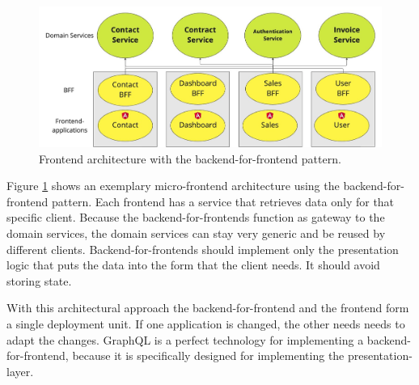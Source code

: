 \ifshowImages
\begin{figure}[H]
    \centering
    \includegraphics[width=0.8\linewidth]{images/ui-bff-architecture.jpeg}
    \caption{Frontend architecture with the backend-for-frontend pattern.}\label{figure:state-of-the-art:ui-bff-architecture}
\end{figure}
\fi

\noindent Figure \ref{figure:state-of-the-art:ui-bff-architecture} shows an exemplary micro-frontend architecture using the backend-for-frontend pattern. Each frontend has a service that retrieves data only for that specific client. Because the backend-for-frontends function as gateway to the domain services, the domain services can stay very generic and be reused by different clients. Backend-for-frontends should implement only the presentation logic that puts the data into the form that the client needs. It should avoid storing state. \cite{misc:2019:leitner:background:micro-frontends:backend-for-frontends}

\bigskip

\noindent With this architectural approach the backend-for-frontend and the frontend form a single deployment unit. If one application is changed, the other needs needs to adapt the changes. GraphQL is a perfect technology for implementing a backend-for-frontend, because it is specifically designed for implementing the presentation-layer.
